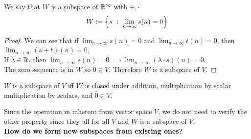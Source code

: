We say that $W$ is a subspace of $\mathbb R^\infty$ with $+, \cdot$
\[ W := \left\{ s \ : \ \lim_{n \to \infty} s(n) = 0 \right\} \]
\begin{proof}
    We can see that if $\displaystyle \lim_{n \to \infty} s(n) = 0$ and $\displaystyle \lim_{n \to \infty} t(n) = 0$, then $\displaystyle \lim_{n \to \infty} (s + t)(n) = 0 $. \\
    If $\lambda \in \mathbb R$, then $\displaystyle \lim_{n \to \infty} s(n) = 0 \implies \lim_{n \to \infty} (\lambda \cdot s)(n) = 0$. \\ The zero sequence is in $W$ so $\bar 0 \in V$. Therefore $W$ is a subspace of $V$.
\end{proof}
\begin{theorem}
    $W$ is a subspace of $V$ iff $W$ is closed under addition, multiplication by scalar multiplication by scalars, and $\bar 0 \in V$.
\end{theorem}
Since the operation in inherent from vector space $V$, we do not need to verify the other property since they all for all $V$ and $W$ is a subspace of $V$. \\
\textbf{How do we form new subspaces from existing ones?}

